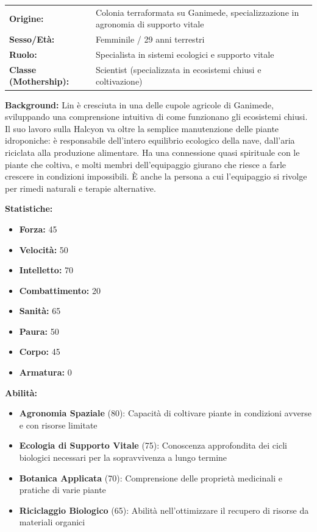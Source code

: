 \documentclass[11pt,a4paper]{article}
\begin{document}
\begin{tcolorbox}[colback=mininglightorange!20, colframe=miningorange]
\begin{tabularx}{\textwidth}{lX}
\textbf{Origine:} & Colonia terraformata su Ganimede, specializzazione in agronomia di supporto vitale \\
\textbf{Sesso/Età:} & Femminile / 29 anni terrestri \\
\textbf{Ruolo:} & Specialista in sistemi ecologici e supporto vitale \\
\textbf{Classe (Mothership):} & Scientist (specializzata in ecosistemi chiusi e coltivazione) \\
\end{tabularx}

\textbf{Background:} Lin è cresciuta in una delle cupole agricole di Ganimede, sviluppando una comprensione intuitiva di come funzionano gli ecosistemi chiusi. Il suo lavoro sulla Halcyon va oltre la semplice manutenzione delle piante idroponiche: è responsabile dell'intero equilibrio ecologico della nave, dall'aria riciclata alla produzione alimentare. Ha una connessione quasi spirituale con le piante che coltiva, e molti membri dell'equipaggio giurano che riesce a farle crescere in condizioni impossibili. È anche la persona a cui l'equipaggio si rivolge per rimedi naturali e terapie alternative.

\textbf{Statistiche:}
\begin{itemize}[leftmargin=*]
\item \textbf{Forza:} 45
\item \textbf{Velocità:} 50
\item \textbf{Intelletto:} 70
\item \textbf{Combattimento:} 20
\item \textbf{Sanità:} 65
\item \textbf{Paura:} 50
\item \textbf{Corpo:} 45
\item \textbf{Armatura:} 0
\end{itemize}

\textbf{Abilità:}
\begin{itemize}[leftmargin=*]
\item \textbf{Agronomia Spaziale} (80): Capacità di coltivare piante in condizioni avverse e con risorse limitate
\item \textbf{Ecologia di Supporto Vitale} (75): Conoscenza approfondita dei cicli biologici necessari per la sopravvivenza a lungo termine
\item \textbf{Botanica Applicata} (70): Comprensione delle proprietà medicinali e pratiche di varie piante
\item \textbf{Riciclaggio Biologico} (65): Abilità nell'ottimizzare il recupero di risorse da materiali organici
\end{itemize}


\end{tcolorbox}
\end{document}

